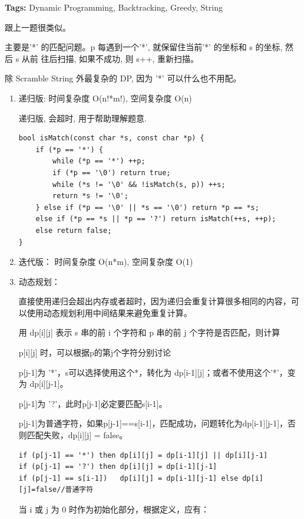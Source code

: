 \documentclass[12pt]{book}
\begin{document}
\textbf{Tags:} Dynamic Programming, Backtracking, Greedy, String

跟上一题很类似。

主要是'*' 的匹配问题。p 每遇到一个'*', 就保留住当前'*' 的坐标和 s 的坐标, 然后 s 从前
往后扫描, 如果不成功, 则 s++, 重新扫描。

除 Scramble String 外最复杂的 DP, 因为 '*' 可以什么也不用配。

\begin{enumerate}
\item 递归版: 时间复杂度 O(n!*m!), 空间复杂度 O(n)
\label{sec-14-3-10-1}

递归版, 会超时, 用于帮助理解题意.

\lstset{language=java,label= ,caption= ,numbers=none}
\begin{lstlisting}
bool isMatch(const char *s, const char *p) {
    if (*p == '*') {
        while (*p == '*') ++p;
        if (*p == '\0') return true;
        while (*s != '\0' && !isMatch(s, p)) ++s;
        return *s != '\0';
    } else if (*p == '\0' || *s == '\0') return *p == *s;
    else if (*p == *s || *p == '?') return isMatch(++s, ++p);
    else return false;
}
\end{lstlisting}

\item 迭代版： 时间复杂度 O(n*m), 空间复杂度 O(1)
\label{sec-14-3-10-2}

\item 动态规划：
\label{sec-14-3-10-3}

直接使用递归会超出内存或者超时，因为递归会重复计算很多相同的内容，可以使用动态规划利用中间结果来避免重复计算。

用 dp[i][j] 表示 s 串的前 i 个字符和 p 串的前 j 个字符是否匹配，则计算

p[i][j] 时，可以根据p的第j个字符分别讨论

p[j-1]为 '*'，s可以选择使用这个*，转化为 dp[i-1][j]；或者不使用这个'*'，变为 dp[i][j-1]。

p[j-1]为 '?'，此时p[j-1]必定要匹配s[i-1]。

p[j-1]为普通字符，如果p[j-1]==s[i-1]，匹配成功，问题转化为dp[i-1][j-1]，否则匹配失败，dp[i][j] = false。
\lstset{language=java,label= ,caption= ,numbers=none}
\begin{lstlisting}
if (p[j-1] == '*') then dp[i][j] = dp[i-1][j] || dp[i][j-1]
if (p[j-1] == '?') then dp[i][j] = dp[i-1][j-1]
if (p[j-1] == s[i-1])   dp[i][j] = dp[i-1][j-1] else dp[i][j]=false//普通字符
\end{lstlisting}
当 i 或 j 为 0 时作为初始化部分，根据定义，应有：


\end{enumerate}
\end{document}
